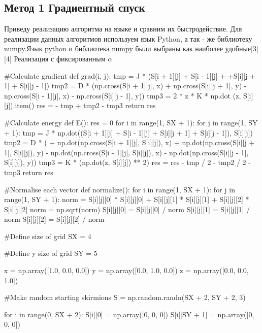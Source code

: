 \documentclass[ 12pt,x11names]{article}
\begin{document}
    \subsection{Метод 1 Градиентный спуск}
    Приведу реализацию алгоритма на языке и сравним их быстродействие.
    Для реализации данных алгоритмов используем язык Python, а так - же библиотеку numpy.Язык python и библиотека numpy  были выбраны как наиболее удобные[3][4]
    Реализация с фиксированным $\alpha$\\
\begin{python}
    #Calculate gradient
    def grad(i, j):
        tmp = J * (S[i + 1][j] + S[i - 1][j] +
        +S[i][j + 1] + S[i][j - 1])
        tmp2 = D * (np.cross(S[i + 1][j], x)
        + np.cross(S[i][j + 1], y)
        - np.cross(S[i - 1][j], x)
        - np.cross(S[i][j - 1], y))
        tmp3 = 2 * z * K * np.dot  (z, S[i][j]).item()
        res = - tmp + tmp2 - tmp3
        return res

    #Calculate energy
    def E():
        res = 0
        for i in range(1, SX + 1):
            for j in range(1, SY + 1):
                tmp = J * np.dot((S[i + 1][j] + S[i - 1][j] +
                S[i][j + 1] + S[i][j - 1]), S[i][j])
                tmp2 = D * (
                + np.dot(np.cross(S[i + 1][j], S[i][j]), x)
                + np.dot(np.cross(S[i][j + 1], S[i][j]), y)
                - np.dot(np.cross(S[i - 1][j], S[i][j]), x)
                - np.dot(np.cross(S[i][j - 1], S[i][j]), y))
                tmp3 = K * (np.dot(z, S[i][j]) ** 2)
                res = res - tmp / 2 - tmp2 / 2 - tmp3
        return res

    #Normalise each vector
    def normalize():
    for i in range(1, SX + 1):
        for j in range(1, SY + 1):
            norm = S[i][j][0] * S[i][j][0] +
                   S[i][j][1] * S[i][j][1] +
                   S[i][j][2] * S[i][j][2]
            norm = np.sqrt(norm)
            S[i][j][0] = S[i][j][0] / norm
            S[i][j][1] = S[i][j][1] / norm
            S[i][j][2] = S[i][j][2] / norm


    #Define size of grid
    SX = 4

    #Define y size of grid
    SY = 5

    x = np.array([1.0, 0.0, 0.0])
    y = np.array([0.0, 1.0, 0.0])
    z = np.array([0.0, 0.0, 1.0])

    #Make random starting skirmions
    S = np.random.randn(SX + 2, SY + 2, 3)

    for i in range(0, SX + 2):
        S[i][0] = np.array([0, 0, 0])
        S[i][SY + 1] = np.array([0, 0, 0])


\end{python}
\end{document}
